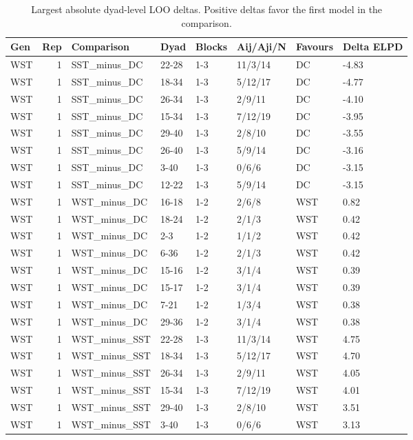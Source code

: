 \begin{table}[!h]
\centering
\caption{Largest absolute dyad-level LOO deltas. Positive deltas favor the first model in the comparison.}
\centering
\begin{tabular}[t]{lrllllll}
\toprule
Gen & Rep & Comparison & Dyad & Blocks & Aij/Aji/N & Favours & Delta ELPD\\
\midrule
WST & 1 & SST_minus_DC & 22-28 & 1-3 & 11/3/14 & DC & -4.83\\
WST & 1 & SST_minus_DC & 18-34 & 1-3 & 5/12/17 & DC & -4.77\\
WST & 1 & SST_minus_DC & 26-34 & 1-3 & 2/9/11 & DC & -4.10\\
WST & 1 & SST_minus_DC & 15-34 & 1-3 & 7/12/19 & DC & -3.95\\
WST & 1 & SST_minus_DC & 29-40 & 1-3 & 2/8/10 & DC & -3.55\\
\addlinespace
WST & 1 & SST_minus_DC & 26-40 & 1-3 & 5/9/14 & DC & -3.16\\
WST & 1 & SST_minus_DC & 3-40 & 1-3 & 0/6/6 & DC & -3.15\\
WST & 1 & SST_minus_DC & 12-22 & 1-3 & 5/9/14 & DC & -3.15\\
WST & 1 & WST_minus_DC & 16-18 & 1-2 & 2/6/8 & WST & 0.82\\
WST & 1 & WST_minus_DC & 18-24 & 1-2 & 2/1/3 & WST & 0.42\\
\addlinespace
WST & 1 & WST_minus_DC & 2-3 & 1-2 & 1/1/2 & WST & 0.42\\
WST & 1 & WST_minus_DC & 6-36 & 1-2 & 2/1/3 & WST & 0.42\\
WST & 1 & WST_minus_DC & 15-16 & 1-2 & 3/1/4 & WST & 0.39\\
WST & 1 & WST_minus_DC & 15-17 & 1-2 & 3/1/4 & WST & 0.39\\
WST & 1 & WST_minus_DC & 7-21 & 1-2 & 1/3/4 & WST & 0.38\\
\addlinespace
WST & 1 & WST_minus_DC & 29-36 & 1-2 & 3/1/4 & WST & 0.38\\
WST & 1 & WST_minus_SST & 22-28 & 1-3 & 11/3/14 & WST & 4.75\\
WST & 1 & WST_minus_SST & 18-34 & 1-3 & 5/12/17 & WST & 4.70\\
WST & 1 & WST_minus_SST & 26-34 & 1-3 & 2/9/11 & WST & 4.05\\
WST & 1 & WST_minus_SST & 15-34 & 1-3 & 7/12/19 & WST & 4.01\\
\addlinespace
WST & 1 & WST_minus_SST & 29-40 & 1-3 & 2/8/10 & WST & 3.51\\
WST & 1 & WST_minus_SST & 3-40 & 1-3 & 0/6/6 & WST & 3.13\\

\end{tabular}
\end{table}
